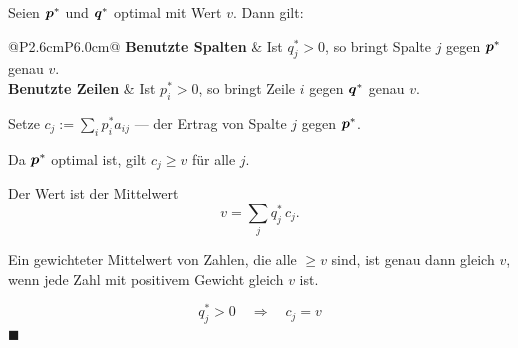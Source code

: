 \begin{merksatz}
Seien $\boldsymbol{p}^{*}$ und $\boldsymbol{q}^{*}$ optimal mit Wert $v$. Dann gilt:
\begin{center}
{\small
\renewcommand{\arraystretch}{1.52}
\begin{tabular}{@{}P{2.6cm}P{6.0cm}@{}}
\toprule
\textbf{Benutzte Spalten} & Ist $q_j^{*} > 0$, so bringt Spalte $j$ gegen $\boldsymbol{p}^{*}$ genau $v$.\\
\textbf{Benutzte Zeilen} & Ist $p_i^{*} > 0$, so bringt Zeile $i$ gegen $\boldsymbol{q}^{*}$ genau $v$.\\
\bottomrule
\end{tabular}}
\end{center}

Setze $c_j := \sum_i p_i^{*} a_{ij}$ --- der Ertrag von Spalte $j$ gegen $\boldsymbol{p}^{*}$.

 Da $\boldsymbol{p}^{*}$ optimal ist, gilt $c_j \ge v$ für alle $j$.

 Der Wert ist der Mittelwert
\[ v = \sum_j q_j^{*}\,c_j . \]

 Ein gewichteter Mittelwert von Zahlen, die alle $\ge v$ sind, ist genau dann gleich $v$, wenn jede Zahl mit positivem Gewicht gleich $v$ ist.

\[ q_j^{*} > 0 \quad\Longrightarrow\quad c_j = v \]
$\blacksquare$

\begin{center}
\begin{minipage}{0.88\textwidth}
\end{minipage}
\end{center}
\end{merksatz}


